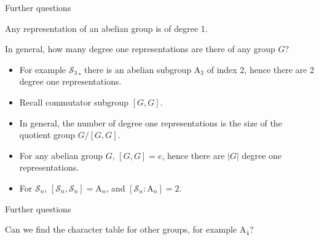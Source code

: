 \documentclass[10pt]{beamer}
\newcommand{\Sym}{\mathcal{S}}
\begin{document}
\begin{frame}{Further questions}
	\begin{corollary}
		Any representation of an abelian group is of degree 1.
	\end{corollary}
	
	\begin{block}{In general, how many degree one representations are there of any group $G$?}
		\begin{itemize}
			\item For example $\Sym_3$¸ there is an abelian subgroup $\text{A}_3$ of index 2, hence there are 2 degree one representations.
			
			\item Recall commutator subgroup $[G,G]$.
			
			\item In general, the number of degree one representations is the size of the quotient group $G/[G,G]$.
			
			\item For any abelian group $G$, $[G,G]=e$, hence there are $|G|$ degree one representations.
			
			\item For $\Sym_n$, $[\Sym_n,\Sym_n] = \text{A}_n$, and $[\Sym_n:\text{A}_n] = 2$.
		\end{itemize}
	\end{block}
\end{frame}
\begin{frame}{Further questions}
	\begin{block}{Can we find the character table for other groups, for example $\text{A}_4$?}
		
	\end{block}
	
\end{frame}	
\end{document}
